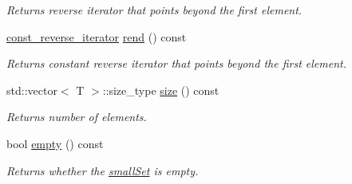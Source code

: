 \begin{CompactItemize}
\begin{CompactList}\small\item\em Returns reverse iterator that points beyond the first element. \item\end{CompactList}\item 
\hypertarget{classdai_1_1smallSet_72f55e13695e993adc7db6fb40b1cd88}{
\hyperlink{classdai_1_1smallSet_46882a9010267d41f447feb6aaf65cc1}{const\_\-reverse\_\-iterator} \hyperlink{classdai_1_1smallSet_72f55e13695e993adc7db6fb40b1cd88}{rend} () const }
\label{classdai_1_1smallSet_72f55e13695e993adc7db6fb40b1cd88}

\begin{CompactList}\small\item\em Returns constant reverse iterator that points beyond the first element. \item\end{CompactList}\item 
\hypertarget{classdai_1_1smallSet_39b00df453666d22331e932d3b7a2f16}{
std::vector$<$ T $>$::size\_\-type \hyperlink{classdai_1_1smallSet_39b00df453666d22331e932d3b7a2f16}{size} () const }
\label{classdai_1_1smallSet_39b00df453666d22331e932d3b7a2f16}

\begin{CompactList}\small\item\em Returns number of elements. \item\end{CompactList}\item 
\hypertarget{classdai_1_1smallSet_b405901de2feb12ff027b973a234a39c}{
bool \hyperlink{classdai_1_1smallSet_b405901de2feb12ff027b973a234a39c}{empty} () const }
\label{classdai_1_1smallSet_b405901de2feb12ff027b973a234a39c}

\begin{CompactList}\small\item\em Returns whether the \hyperlink{classdai_1_1smallSet}{smallSet} is empty. \item\end{CompactList}\end{CompactItemize}
